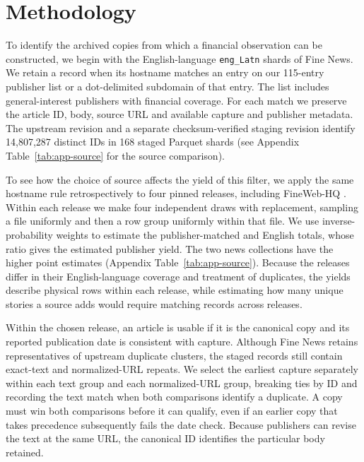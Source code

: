 \section{Methodology}
\label{sec:method}

To identify the archived copies from which a financial observation can
be constructed, we begin with the English-language \texttt{eng\_Latn}
shards of Fine News. We retain a record when its hostname matches an
entry on our 115-entry publisher list or a dot-delimited subdomain of
that entry. The list includes general-interest publishers with financial
coverage. For each match we preserve the article ID, body, source URL
and available capture and publisher metadata. The upstream revision
and a separate checksum-verified staging revision identify 14,807,287
distinct IDs in 168 staged Parquet shards (see Appendix
Table~\ref{tab:app-source} for the source comparison).

To see how the choice of source affects the yield of this filter, we
apply the same hostname rule retrospectively to four pinned releases,
including FineWeb-HQ \citep{messmer2025}. Within each release we make
four independent draws with replacement, sampling a file uniformly and
then a row group uniformly within that file. We use inverse-probability
weights to estimate the publisher-matched and English totals, whose ratio
gives the estimated publisher yield. The two news collections have the
higher point estimates (Appendix Table~\ref{tab:app-source}). Because
the releases differ in their English-language coverage and treatment of
duplicates, the yields describe physical rows within each release, while
estimating how many unique stories a source adds would require matching
records across releases.

Within the chosen release, an article is usable if it is the canonical
copy and its reported publication date is consistent with capture.
Although Fine News retains representatives of upstream duplicate clusters,
the staged records still contain exact-text and normalized-URL repeats.
We select the earliest capture separately within each text group and
each normalized-URL group, breaking ties by ID and recording the text
match when both comparisons identify a duplicate. A copy must win both
comparisons before it can qualify, even if an earlier copy that takes
precedence subsequently fails the date check. Because publishers can
revise the text at the same URL, the canonical ID identifies the
particular body retained.

